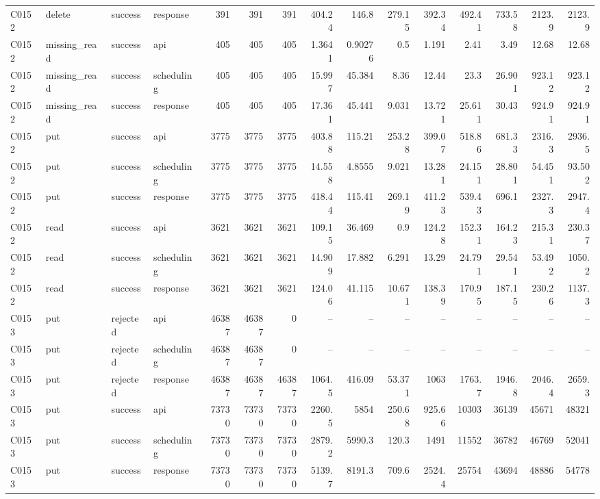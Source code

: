 \begin{landscape}
\begin{longtable}{llllrrrrrrrrrrr}
C0152 & delete & success & response & 391 & 391 & 391 & 404.24 & 146.8 & 279.15 & 392.34 & 492.41 & 733.58 & 2123.9 & 2123.9\\
C0152 & missing\_\allowbreak{}read & success & api & 405 & 405 & 405 & 1.3641 & 0.90276 & 0.5 & 1.191 & 2.41 & 3.49 & 12.68 & 12.68\\
C0152 & missing\_\allowbreak{}read & success & scheduling & 405 & 405 & 405 & 15.997 & 45.384 & 8.36 & 12.44 & 23.3 & 26.901 & 923.12 & 923.12\\
C0152 & missing\_\allowbreak{}read & success & response & 405 & 405 & 405 & 17.361 & 45.441 & 9.031 & 13.721 & 25.611 & 30.43 & 924.91 & 924.91\\
C0152 & put & success & api & 3775 & 3775 & 3775 & 403.88 & 115.21 & 253.28 & 399.07 & 518.86 & 681.33 & 2316.3 & 2936.5\\
C0152 & put & success & scheduling & 3775 & 3775 & 3775 & 14.558 & 4.8555 & 9.021 & 13.281 & 24.151 & 28.801 & 54.451 & 93.502\\
C0152 & put & success & response & 3775 & 3775 & 3775 & 418.44 & 115.41 & 269.19 & 411.23 & 539.43 & 696.1 & 2327.3 & 2947.4\\
C0152 & read & success & api & 3621 & 3621 & 3621 & 109.15 & 36.469 & 0.9 & 124.28 & 152.31 & 164.23 & 215.31 & 230.37\\
C0152 & read & success & scheduling & 3621 & 3621 & 3621 & 14.909 & 17.882 & 6.291 & 13.29 & 24.791 & 29.541 & 53.492 & 1050.2\\
C0152 & read & success & response & 3621 & 3621 & 3621 & 124.06 & 41.115 & 10.671 & 138.39 & 170.95 & 187.15 & 230.26 & 1137.3\\
C0153 & put & rejected & api & 46387 & 46387 & 0 & -- & -- & -- & -- & -- & -- & -- & --\\
C0153 & put & rejected & scheduling & 46387 & 46387 & 0 & -- & -- & -- & -- & -- & -- & -- & --\\
C0153 & put & rejected & response & 46387 & 46387 & 46387 & 1064.5 & 416.09 & 53.371 & 1063 & 1763.7 & 1946.8 & 2046.4 & 2659.3\\
C0153 & put & success & api & 73730 & 73730 & 73730 & 2260.5 & 5854 & 250.68 & 925.66 & 10303 & 36139 & 45671 & 48321\\
C0153 & put & success & scheduling & 73730 & 73730 & 73730 & 2879.2 & 5990.3 & 120.3 & 1491 & 11552 & 36782 & 46769 & 52041\\
C0153 & put & success & response & 73730 & 73730 & 73730 & 5139.7 & 8191.3 & 709.6 & 2524.4 & 25754 & 43694 & 48886 & 54778\\

\end{longtable}
\end{landscape}
